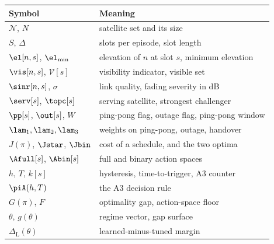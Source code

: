 \begin{tabular}{ll}
\toprule
Symbol & Meaning \\
\midrule
$\mathcal{N}$, $N$ & satellite set and its size \\
$S$, $\Delta$ & slots per episode, slot length \\
$\el[n,s]$, $\el_{\min}$ & elevation of $n$ at slot $s$, minimum elevation \\
$\vis[n,s]$, $\mathcal{V}[s]$ & visibility indicator, visible set \\
$\sinr[n,s]$, $\sigma$ & link quality, fading severity in dB \\
$\serv[s]$, $\topc[s]$ & serving satellite, strongest challenger \\
$\pp[s]$, $\out[s]$, $W$ & ping-pong flag, outage flag, ping-pong window \\
$\lam_1,\lam_2,\lam_3$ & weights on ping-pong, outage, handover \\
$J(\pi)$, $\Jstar$, $\Jbin$ & cost of a schedule, and the two optima \\
$\Afull[s]$, $\Abin[s]$ & full and binary action spaces \\
$h$, $T$, $k[s]$ & hysteresis, time-to-trigger, A3 counter \\
$\piA(h,T)$ & the A3 decision rule \\
$G(\pi)$, $F$ & optimality gap, action-space floor \\
$\theta$, $g(\theta)$ & regime vector, gap surface \\
$\Delta_{\mathrm{L}}(\theta)$ & learned-minus-tuned margin \\
\bottomrule
\end{tabular}
